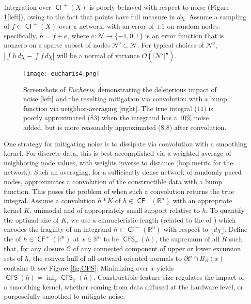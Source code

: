 \documentclass{psapm-l}
\theoremstyle{definition}
\theoremstyle{remark}
\numberwithin{equation}{section}
\begin{document}
Integration over ${{{\operatorname{\mathsf{{CF}}}}}}^+(X)$ is poorly behaved with respect to noise (Figure \ref{fig:eucharis4}[left]), owing to the fact that points have full measure in $d\chi$. Assume a sampling of $f\in{{{\operatorname{\mathsf{{CF}}}}}}^+(X)$ over a network, with an error of $\pm 1$ on random nodes: specifically, $h=f+e$, where $e\colon{{\mathcal N}}\to\{-1,0,1\}$ is an error function that is nonzero on a sparse subset of nodes ${{\mathcal N}}'\subset{{\mathcal N}}$. For typical choices of ${{\mathcal N}}'$, ${\left\vert{{\int h\, d\chi - \int f\, d\chi}}\right\vert}$ will be a normal of variance $O({\left\vert{{{{\mathcal N}}'}}\right\vert}^\frac{1}{2})$.

\begin{figure}[hbt]
\begin{center}
\texttt{[image: eucharis4.png]}
\caption{Screenshots of {\em Eucharis}, demonstrating the deleterious impact of noise [left] and the resulting mitigation via convolution with a bump function via neighbor-averaging [right]. The true integral ($11$) is poorly approximated ($83$) when the integrand has a $10\%$ noise added, but is more reasonably approximated ($8.8$) after convolution.}
\label{fig:eucharis4}
\end{center}
\end{figure}

One strategy for mitigating noise is to dissipate via convolution with a smoothing kernel. For discrete data, this is best accomplished via a weighted average of neighboring node values, with weights inverse to distance (hop metric for the network). Such an averaging, for a sufficiently dense network of randomly paced nodes, approximates a convolution of the constructible data with a bump function. This poses the problem of when such a convolution returns the true integral. Assume a convolution $h*{{K}}$ of $h\in{{{\operatorname{\mathsf{{CF}}}}}}^+({{\mathbb R}}^n)$ with an appropriate kernel ${{K}}$, unimodal and of appropriately small support relative to $h$. To quantify the optimal size of  ${{K}}$, we use a characteristic length (related to the {{}} of \cite{Chazal}) which encodes the fragility of an integrand $h\in {{{\operatorname{\mathsf{{CF}}}}}}^+({{\mathbb R}}^n)$ with respect to ${{\lfloor d\chi\rfloor}}$. Define the {{}} of $h\in {{{\operatorname{\mathsf{{CF}}}}}}^+({{\mathbb R}}^n)$ at $x\in{{\mathbb R}}^n$ to be
${{{\operatorname{\mathsf{{CFS}}}}}}_x(h)$, the supremum of all $R$ such that, for any closure ${{\mathcal C}}$ of any connected component of upper or lower excursion sets of $h$, the convex hull of all outward-oriented normals to ${\partial}{{\mathcal C}}\cap B_R(x)$ contains $0$: see Figure \ref{fig:CFS}. Minimizing over $x$ yields ${{{\operatorname{\mathsf{{CFS}}}}}}(h)=\inf_x{{{\operatorname{\mathsf{{CFS}}}}}}_x(h)$. Constructible feature size regulates the impact of a smoothing kernel, whether coming from data diffused at the hardware level, or purposefully smoothed to mitigate noise.
\end{document}
